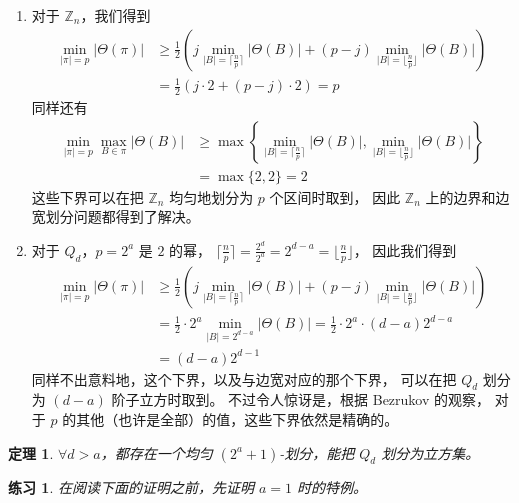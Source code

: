 \documentclass[12pt, a4paper]{article}
\newtheorem{theorem}{定理}
\newtheorem{exercise}{练习}
\begin{document}
\begin{enumerate}[(1)]
	\item 对于 $\mathbb{Z}_n$，我们得到
		\begin{align*}
		\min_{|\pi| = p} |\Theta(\pi)|
		& \ge \frac{1}{2} \left(
			j \min_{|B| = \lceil\frac{n}{p}\rceil} |\Theta(B)| +
			(p - j) \min_{|B| = \lfloor\frac{n}{p}\rfloor} |\Theta(B)|
		\right) \\
		& = \frac{1}{2} \left(
			j \cdot 2 + (p - j) \cdot 2
		\right) = p
		\end{align*}
		同样还有
		\begin{align*}
		\min_{|\pi| = p} \max_{B \in \pi} |\Theta(B)|
		& \ge \max\left\{
			\min_{|B| = \lceil\frac{n}{p}\rceil} |\Theta(B)|,
			\min_{|B| = \lfloor\frac{n}{p}\rfloor} |\Theta(B)|
		\right\} \\
		& = \max\{2, 2\} = 2
		\end{align*}
		这些下界可以在把 $\mathbb{Z}_n$ 均匀地划分为 $p$ 个区间时取到，
		因此 $\mathbb{Z}_n$ 上的边界和边宽划分问题都得到了解决。
	\item 对于 $Q_d$，$p = 2^a$ 是 $2$ 的幂，
		$\lceil\frac{n}{p}\rceil = \frac{2^d}{2^a} = 2^{d - a} = \lfloor\frac{n}{p}\rfloor$，
		因此我们得到
		\begin{align*}
		\min_{|\pi| = p} |\Theta(\pi)|
		& \ge \frac{1}{2} \left(
			j \min_{|B| = \lceil\frac{n}{p}\rceil} |\Theta(B)| +
			(p - j) \min_{|B| = \lfloor\frac{n}{p}\rfloor} |\Theta(B)|
		\right) \\
		& = \frac{1}{2} \cdot 2^a \min_{|B| = 2^{d - a}}|\Theta(B)|
		  = \frac{1}{2} \cdot 2^a \cdot (d - a) 2^{d - a} \\
		& = (d - a) 2^{d - 1}
		\end{align*}
		同样不出意料地，这个下界，以及与边宽对应的那个下界，
		可以在把 $Q_d$ 划分为 $(d - a)$ 阶子立方时取到。
		不过令人惊讶是，根据 Bezrukov \cite{Bezrukov.1997} 的观察，
		对于 $p$ 的其他（也许是全部）的值，这些下界依然是精确的。
\end{enumerate}

\begin{theorem}
\label{Theorem 3}
$\forall d > a$，都存在一个均匀 $(2^a + 1)$-划分，能把 $Q_d$ 划分为立方集。
\end{theorem}

\begin{exercise}
\label{Exercise 15}
在阅读下面的证明之前，先证明 $a = 1$ 时的特例。
\end{exercise}
\end{document}
